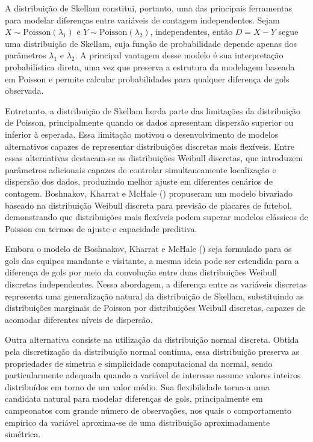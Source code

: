 \documentclass[12pt,a4paper]{article}\usepackage[]{graphicx}\usepackage[]{xcolor}
\begin{document}
A distribuição de Skellam constitui, portanto, uma das principais ferramentas para modelar diferenças entre variáveis de contagem independentes. Sejam \(X \sim \text{Poisson}(\lambda_1)\) e \(Y \sim \text{Poisson}(\lambda_2)\), independentes, então \(D=X-Y\) segue uma distribuição de Skellam, cuja função de probabilidade depende apenas dos parâmetros \(\lambda_1\) e \(\lambda_2\). A principal vantagem desse modelo é sua interpretação probabilística direta, uma vez que preserva a estrutura da modelagem baseada em Poisson e permite calcular probabilidades para qualquer diferença de gols observada.

Entretanto, a distribuição de Skellam herda parte das limitações da distribuição de Poisson, principalmente quando os dados apresentam dispersão superior ou inferior à esperada. Essa limitação motivou o desenvolvimento de modelos alternativos capazes de representar distribuições discretas mais flexíveis. Entre essas alternativas destacam-se as distribuições Weibull discretas, que introduzem parâmetros adicionais capazes de controlar simultaneamente localização e dispersão dos dados, produzindo melhor ajuste em diferentes cenários de contagem. Boshnakov, Kharrat e McHale (\citeyear{boshnakov2017}) propuseram um modelo bivariado baseado na distribuição Weibull discreta para previsão de placares de futebol, demonstrando que distribuições mais flexíveis podem superar modelos clássicos de Poisson em termos de ajuste e capacidade preditiva.

Embora o modelo de Boshnakov, Kharrat e McHale (\citeyear{boshnakov2017}) seja formulado para os gols das equipes mandante e visitante, a mesma ideia pode ser estendida para a diferença de gols por meio da convolução entre duas distribuições Weibull discretas independentes. Nessa abordagem, a diferença entre as variáveis discretas representa uma generalização natural da distribuição de Skellam, substituindo as distribuições marginais de Poisson por distribuições Weibull discretas, capazes de acomodar diferentes níveis de dispersão.

Outra alternativa consiste na utilização da distribuição normal discreta. Obtida pela discretização da distribuição normal contínua, essa distribuição preserva as propriedades de simetria e simplicidade computacional da normal, sendo particularmente adequada quando a variável de interesse assume valores inteiros distribuídos em torno de um valor médio. Sua flexibilidade torna-a uma candidata natural para modelar diferenças de gols, principalmente em campeonatos com grande número de observações, nos quais o comportamento empírico da variável aproxima-se de uma distribuição aproximadamente simétrica.
\end{document}
